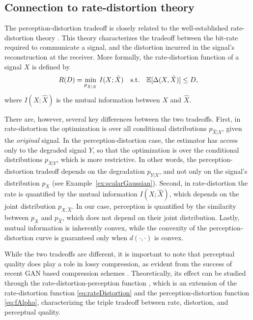 \subsection{Connection to rate-distortion theory}\label{sec:rateDistortion}
The perception-distortion tradeoff is closely related to the well-established rate-distortion theory \cite{cover2012elements}. This theory characterizes the tradeoff between the bit-rate required to communicate a signal, and the distortion incurred in the signal's reconstruction at the receiver. More formally, the rate-distortion function of a signal $X$ is defined by
\begin{equation}\label{eq:rateDistortion}
R(D) = \min_{p_{\hat{X} \vert X}} \, I(X;\hat{X}) \quad \text{s.t.} \quad  \mathbb{E}[\Delta(X,\hat{X})] \le D,
\end{equation}
where $I(\!X;\hat{X}\!)$ is the mutual information between $X$ and $\hat{X}$.

There are, however, several key differences between the two tradeoffs. First, in rate-distortion the optimization is over all conditional distributions $p_{\hat{X} \vert X}$, \ie given the \emph{original} signal. In the perception-distortion case, the estimator has access only to the degraded signal $Y$, so that the optimization is over the conditional distributions $p_{\hat{X} \vert Y}$, which is more restrictive. In other words, the perception-distortion tradeoff depends on the degradation $p_{Y|X}$, and not only on the signal's distribution $p_X$ (see Example~\ref{ex:scalarGaussian}). Second, in rate-distortion the rate is quantified by the mutual information $I(X;\hat{X})$, which depends on the joint distribution $p_{X,\hat{X}}$. In our case, perception is quantified by the similarity between $p_X$ and $p_{\hat{X}}$, which does not depend on their joint distribution. Lastly, mutual information is inherently convex, while the convexity of the perception-distortion curve is guaranteed only when $d(\cdot,\cdot)$ is convex.

While the two tradeoffs are different, it is important to note that perceptual quality does play a role in lossy compression, as evident from the success of recent GAN based compression schemes \cite{tschannen2018deep, agustsson2018generative, santurkar2018generative}. Theoretically, its effect can be studied through the rate-distortion-perception function \cite{blau2019rethinking,matsumoto2018introducing,matsumoto2018rate}, which is an extension of the rate-distortion function \eqref{eq:rateDistortion} and the perception-distortion function \eqref{eq:fAlpha}, characterizing the triple tradeoff between rate, distortion, and perceptual quality. 

